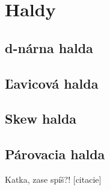 \section{Haldy}
\subsection{d-nárna halda}
\subsection{Ľavicová halda}
\subsection{Skew halda}
\subsection{Párovacia halda}
Katka, zase spíš?!
[citacie]